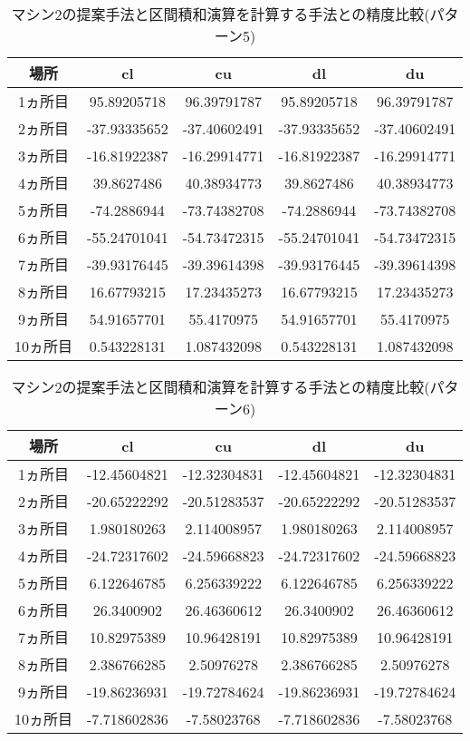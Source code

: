 \documentclass[11pt,a4paper]{jsreport}
\theoremstyle{definition}
\begin{document}
\begin{table}[H]
\centering
\begin{tabular}{|c|c|c|c|c|}
\hline
場所 & cl & cu & dl & du \\ \hline
1ヵ所目 & 95.89205718 & 96.39791787 & 95.89205718 & 96.39791787 \\ \hline
2ヵ所目 & -37.93335652 & -37.40602491 & -37.93335652 & -37.40602491 \\ \hline
3ヵ所目 & -16.81922387 & -16.29914771 & -16.81922387 & -16.29914771 \\ \hline
4ヵ所目 & 39.8627486 & 40.38934773 & 39.8627486 & 40.38934773 \\ \hline
5ヵ所目 & -74.2886944 & -73.74382708 & -74.2886944 & -73.74382708 \\ \hline
6ヵ所目 & -55.24701041 & -54.73472315 & -55.24701041 & -54.73472315 \\ \hline
7ヵ所目 & -39.93176445 & -39.39614398 & -39.93176445 & -39.39614398 \\ \hline
8ヵ所目 & 16.67793215 & 17.23435273 & 16.67793215 & 17.23435273 \\ \hline
9ヵ所目 & 54.91657701 & 55.4170975 & 54.91657701 & 55.4170975 \\ \hline
10ヵ所目 & 0.543228131 & 1.087432098 & 0.543228131 & 1.087432098 \\ \hline
\end{tabular}
\caption{マシン2の提案手法と区間積和演算を計算する手法との精度比較(パターン5)}
\end{table}

\begin{table}[H]
\centering
\begin{tabular}{|c|c|c|c|c|}
\hline
場所 & cl & cu & dl & du \\ \hline
1ヵ所目 & -12.45604821 & -12.32304831 & -12.45604821 & -12.32304831 \\ \hline
2ヵ所目 & -20.65222292 & -20.51283537 & -20.65222292 & -20.51283537 \\ \hline
3ヵ所目 & 1.980180263 & 2.114008957 & 1.980180263 & 2.114008957 \\ \hline
4ヵ所目 & -24.72317602 & -24.59668823 & -24.72317602 & -24.59668823 \\ \hline
5ヵ所目 & 6.122646785 & 6.256339222 & 6.122646785 & 6.256339222 \\ \hline
6ヵ所目 & 26.3400902 & 26.46360612 & 26.3400902 & 26.46360612 \\ \hline
7ヵ所目 & 10.82975389 & 10.96428191 & 10.82975389 & 10.96428191 \\ \hline
8ヵ所目 & 2.386766285 & 2.50976278 & 2.386766285 & 2.50976278 \\ \hline
9ヵ所目 & -19.86236931 & -19.72784624 & -19.86236931 & -19.72784624 \\ \hline
10ヵ所目 & -7.718602836 & -7.58023768 & -7.718602836 & -7.58023768 \\ \hline
\end{tabular}
\caption{マシン2の提案手法と区間積和演算を計算する手法との精度比較(パターン6)}
\end{table}
\end{document}
